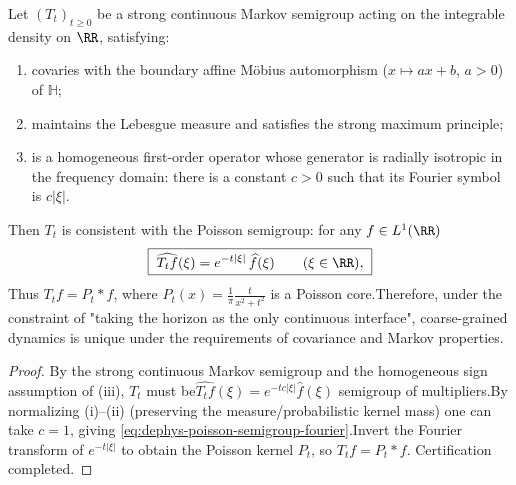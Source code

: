 \begin{theorem}\label{thm:dephys-mobius-markov-unique-poisson}Let \((T_t)_{t\ge 0}\) be a strong continuous Markov semigroup acting on the integrable density on \(\RR\), satisfying:\begin{enumerate}
\item[(i)] covaries with the boundary affine Möbius automorphism (\(x\mapsto ax+b\), \(a>0\)) of \(\mathbb{H}\);\item[(ii)] maintains the Lebesgue measure and satisfies the strong maximum principle;\item[(iii)] is a homogeneous first-order operator whose generator is radially isotropic in the frequency domain: there is a constant \(c>0\) such that its Fourier symbol is \(c|\xi|\).\end{enumerate}
Then \(T_t\) is consistent with the Poisson semigroup: for any \(f\in L^1(\RR)\)\begin{equation}\label{eq:dephys-poisson-semigroup-fourier}
\boxed{\;
\widehat{T_t f}(\xi)=e^{-t|\xi|}\,\widehat f(\xi)\qquad(\xi\in\RR),\;}
\end{equation}
Thus \(T_t f=P_t*f\), where \(P_t(x)=\frac{1}{\pi}\frac{t}{x^2+t^2}\) is a Poisson core.Therefore, under the constraint of "taking the horizon as the only continuous interface", coarse-grained dynamics is unique under the requirements of covariance and Markov properties.\end{theorem}

\begin{proof}
By the strong continuous Markov semigroup and the homogeneous sign assumption of (iii), \(T_t\) must be\(
\widehat{T_t f}(\xi)=e^{-t c|\xi|}\widehat f(\xi)
\) semigroup of multipliers.By normalizing (i)–(ii) (preserving the measure/probabilistic kernel mass) one can take \(c=1\), giving \eqref{eq:dephys-poisson-semigroup-fourier}.Invert the Fourier transform of \(e^{-t|\xi|}\) to obtain the Poisson kernel \(P_t\), so \(T_t f=P_t*f\). Certification completed.\end{proof}

